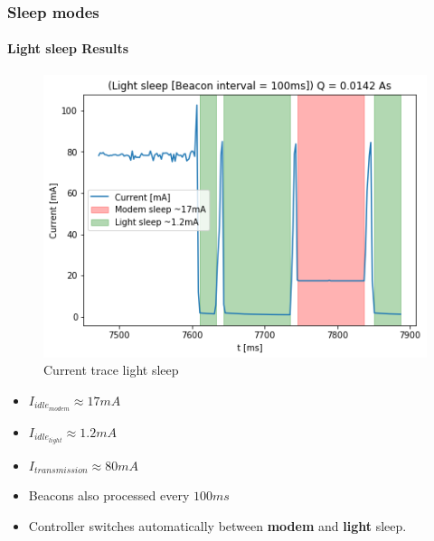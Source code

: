 \begin{frame}
    \frametitle{Sleep modes}
    \framesubtitle{Light sleep Results}

    \begin{minipage}{0.45 \textwidth}
        \begin{figure}[H]
            \centering
            \includegraphics[width = 1 \linewidth]{../paper/fig/light_sleep.png}
            \caption{Current trace light sleep}
            \label{fig:experiment_modem_light_sleep}
        \end{figure}
    \end{minipage}
    \begin{minipage}{0.45 \textwidth}
        \begin{itemize}
            \item $I_{idle_{modem}} \approx 17mA$
            \item $I_{idle_{light}} \approx 1.2mA$
            \item $I_{transmission} \approx 80mA$
            \item Beacons also processed every $100ms$
            \item Controller switches automatically between \textbf{modem} and \textbf{light} sleep.
        \end{itemize}
    \end{minipage}
\end{frame}


